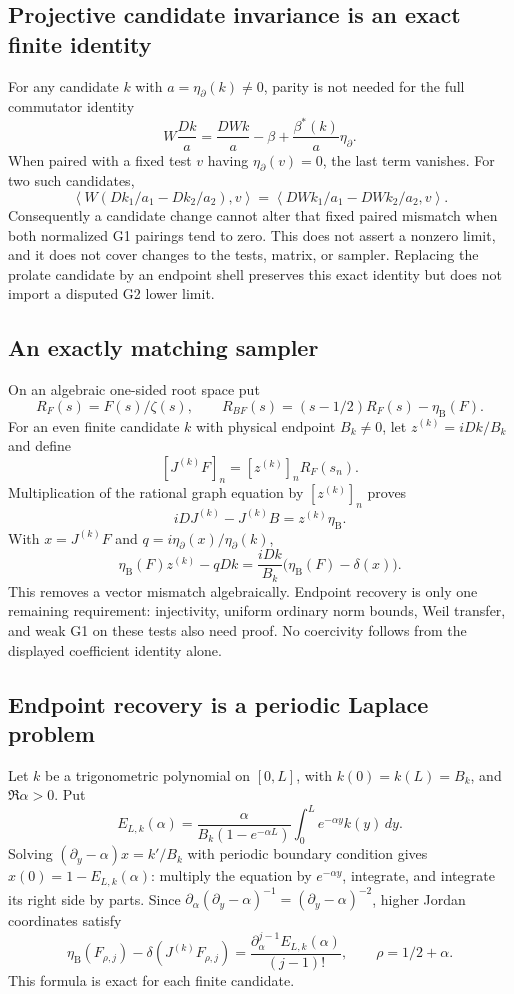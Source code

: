 \documentclass[11pt]{article}
\theoremstyle{remark}
\newcommand{\ip}[2]{\left\langle #1,#2\right\rangle}
\begin{document}
\subsection*{Projective candidate invariance is an exact finite identity}
For any candidate $k$ with $a=\eta_\partial(k)\ne0$, parity is not
needed for the full commutator identity
\[
 W\frac{Dk}{a}=\frac{DWk}{a}-\beta
             +\frac{\beta^*(k)}{a}\eta_\partial.
\]
When paired with a fixed test $v$ having $\eta_\partial(v)=0$, the
last term vanishes. For two such candidates,
\[
 \ip{W(Dk_1/a_1-Dk_2/a_2)}{v}
 =\ip{DWk_1/a_1-DWk_2/a_2}{v}.
\]
Consequently a candidate change cannot alter that fixed paired mismatch
when both normalized G1 pairings tend to zero. This does not assert a
nonzero limit, and it does not cover changes to the tests, matrix, or
sampler. Replacing the prolate candidate by an endpoint shell preserves
this exact identity but does not import a disputed G2 lower limit.

\subsection*{An exactly matching sampler}
On an algebraic one-sided root space put
\[
 R_F(s)=F(s)/\zeta(s),\qquad
 R_{BF}(s)=(s-1/2)R_F(s)-\eta_{\mathrm B}(F).
\]
For an even finite candidate $k$ with physical endpoint $B_k\ne0$,
let $z^{(k)}=iDk/B_k$ and define
\begin{equation}\label{eq:v1-exactmatcher}
 [J^{(k)}F]_n=[z^{(k)}]_nR_F(s_n).
\end{equation}
Multiplication of the rational graph equation by $[z^{(k)}]_n$ proves
\[
 iDJ^{(k)}-J^{(k)}B=z^{(k)}\eta_{\mathrm B}.
\]
With $x=J^{(k)}F$ and $q=i\eta_\partial(x)/\eta_\partial(k)$,
\[
 \eta_{\mathrm B}(F)z^{(k)}-qDk
 =\frac{iDk}{B_k}\bigl(\eta_{\mathrm B}(F)-\delta(x)\bigr).
\]
This removes a vector mismatch algebraically. Endpoint recovery is only
one remaining requirement: injectivity, uniform ordinary norm bounds,
Weil transfer, and weak G1 on these tests also need proof. No coercivity
follows from the displayed coefficient identity alone.

\subsection*{Endpoint recovery is a periodic Laplace problem}
Let $k$ be a trigonometric polynomial on $[0,L]$, with
$k(0)=k(L)=B_k$, and $\Re\alpha>0$. Put
\[
 E_{L,k}(\alpha)=\frac{\alpha}{B_k(1-e^{-\alpha L})}
                   \int_0^Le^{-\alpha y}k(y)\,dy.
\]
Solving $(\partial_y-\alpha)x=k'/B_k$ with periodic boundary condition
gives $x(0)=1-E_{L,k}(\alpha)$: multiply the equation by
$e^{-\alpha y}$, integrate, and integrate its right side by parts.
Since $\partial_\alpha(\partial_y-\alpha)^{-1}
=(\partial_y-\alpha)^{-2}$, higher Jordan coordinates satisfy
\[
 \eta_{\mathrm B}(F_{\rho,j})-\delta(J^{(k)}F_{\rho,j})
 =\frac{\partial_\alpha^{j-1}E_{L,k}(\alpha)}{(j-1)!},
 \qquad \rho=1/2+\alpha.
\]
This formula is exact for each finite candidate.
\end{document}
